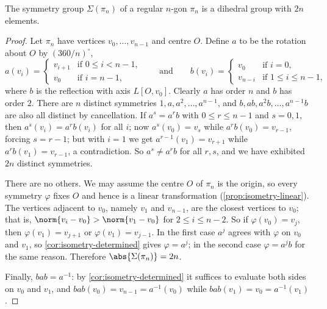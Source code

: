 \begin{theorem}\label{thm:dihedral}
	The symmetry group \(\Sigma(\pi_n)\) of a regular \(n\)-gon \(\pi_n\) is a dihedral
	group with \(2n\) elements.
\end{theorem}

\begin{proof}
	Let \(\pi_n\) have vertices \(v_0, \dots, v_{n-1}\) and centre \(O\). Define \(a\) to be
	the rotation about \(O\) by \((360/n)^\circ\),
	\[
		a(v_i) = \begin{cases}
			v_{i+1} & \text{if } 0 \leq i < n-1, \\
			v_0     & \text{if } i = n-1,
		\end{cases}
		\qquad\text{and}\qquad
		b(v_i) = \begin{cases}
			v_0     & \text{if } i = 0,          \\
			v_{n-i} & \text{if } 1 \leq i \leq n-1,
		\end{cases}
	\]
	where \(b\) is the reflection with axis \(L[O, v_0]\). Clearly \(a\) has order \(n\) and
	\(b\) has order \(2\). There are \(n\) distinct symmetries \(1, a, a^2, \dots, a^{n-1}\),
	and \(b, ab, a^2b, \dots, a^{n-1}b\) are also all distinct by cancellation. If
	\(a^s = a^r b\) with \(0 \leq r \leq n-1\) and \(s = 0, 1\), then \(a^s(v_i) = a^rb(v_i)\)
	for all \(i\); now \(a^s(v_0) = v_s\) while \(a^rb(v_0) = v_{r-1}\), forcing
	\(s = r-1\); but with \(i = 1\) we get \(a^{r-1}(v_1) = v_{r+1}\) while
	\(a^rb(v_1) = v_{r-1}\), a contradiction. So \(a^s \neq a^r b\) for all \(r, s\), and we
	have exhibited \(2n\) distinct symmetries.

	There are no others. We may assume the centre \(O\) of \(\pi_n\) is the origin, so every
	symmetry \(\varphi\) fixes \(O\) and hence is a linear transformation
	(\autoref{prop:isometry-linear}). The vertices adjacent to \(v_0\), namely
	\(v_1\) and \(v_{n-1}\), are the closest vertices to \(v_0\); that is,
	\(\norm{v_i - v_0} > \norm{v_1 - v_0}\) for \(2 \leq i \leq n-2\). So if
	\(\varphi(v_0) = v_j\), then \(\varphi(v_1) = v_{j+1}\) or \(\varphi(v_1) = v_{j-1}\). In
	the first case \(a^j\) agrees with \(\varphi\) on \(v_0\) and \(v_1\), so
	\autoref{cor:isometry-determined} gives \(\varphi = a^j\); in the second case
	\(\varphi = a^j b\) for the same reason. Therefore \(\abs{\Sigma(\pi_n)} = 2n\).

	Finally, \(bab = a^{-1}\): by \autoref{cor:isometry-determined} it suffices to
	evaluate both sides on \(v_0\) and \(v_1\), and
	\(bab(v_0) = v_{n-1} = a^{-1}(v_0)\) while \(bab(v_1) = v_0 = a^{-1}(v_1)\).
\end{proof}

